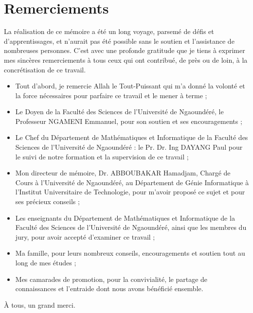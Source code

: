 \chapter*{Remerciements}

\renewcommand{\abstractnamefont}{\normalfont\Large\bfseries}


\hskip7mm
\begin{spacing}{1.3}

La réalisation de ce mémoire a été un long voyage, parsemé de défis et d'apprentissages, et n'aurait pas été possible sans le soutien et l'assistance de nombreuses personnes. C'est avec une profonde gratitude que je tiens à exprimer mes sincères remerciements à tous ceux qui ont contribué, de près ou de loin, à la concrétisation de ce travail.

\begin{itemize}
    \item Tout d'abord, je remercie Allah le Tout-Puissant qui m'a donné la volonté et la force nécessaires pour parfaire ce travail et le mener à terme ;
    \item Le Doyen de la Faculté des Sciences de l’Université de Ngaoundéré, le Professeur NGAMENI Emmanuel, pour son soutien et ses encouragements ;
    \item Le Chef du Département de Mathématiques et Informatique de la Faculté des Sciences de l’Université de Ngaoundéré : le Pr. Dr. Ing DAYANG Paul pour le suivi de notre formation et la supervision de ce travail ;
    \item Mon directeur de mémoire, Dr. ABBOUBAKAR Hamadjam, Chargé de Cours à l’Université de Ngaoundéré, au Département de Génie Informatique à l’Institut Universitaire de Technologie, pour m'avoir proposé ce sujet et pour ses précieux conseils ;
    \item Les enseignants du Département de Mathématiques et Informatique de la Faculté des Sciences de l’Université de Ngaoundéré, ainsi que les membres du jury, pour avoir accepté d'examiner ce travail ;
    \item Ma famille, pour leurs nombreux conseils, encouragements et soutien tout au long de mes études ;
    \item Mes camarades de promotion, pour la convivialité, le partage de connaissances et l'entraide dont nous avons bénéficié ensemble.
\end{itemize}

À tous, un grand merci.
\end{spacing}

